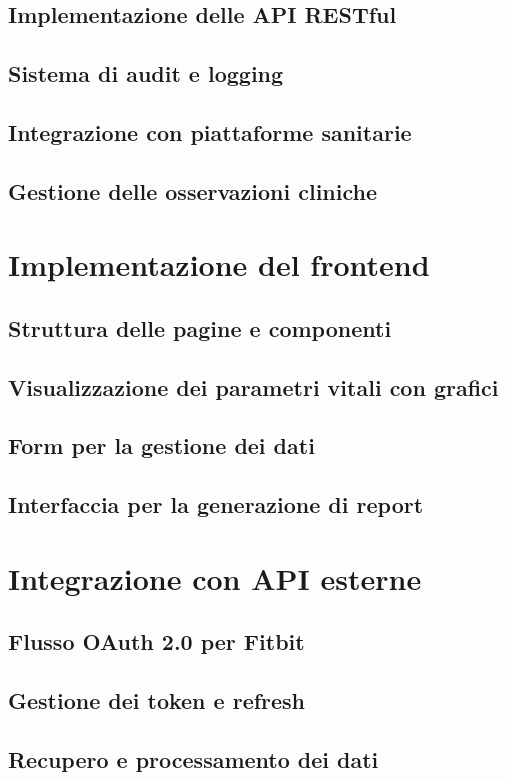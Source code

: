 \documentclass[12pt,a4paper,oneside]{report}
\begin{document}
\subsection{Implementazione delle API RESTful}
\subsection{Sistema di audit e logging}
\subsection{Integrazione con piattaforme sanitarie}
\subsection{Gestione delle osservazioni cliniche}

\section{Implementazione del frontend}
\subsection{Struttura delle pagine e componenti}
\subsection{Visualizzazione dei parametri vitali con grafici}
\subsection{Form per la gestione dei dati}
\subsection{Interfaccia per la generazione di report}

\section{Integrazione con API esterne}
\subsection{Flusso OAuth 2.0 per Fitbit}
\subsection{Gestione dei token e refresh}
\subsection{Recupero e processamento dei dati}
\end{document}
